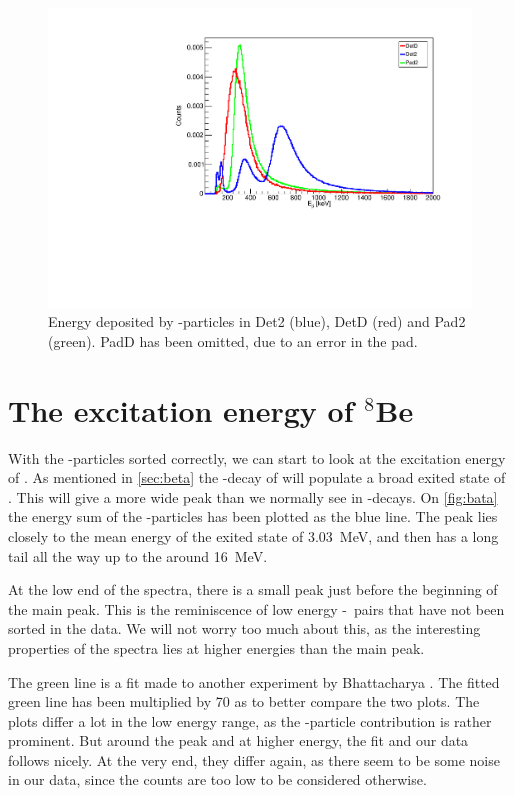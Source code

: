 \begin{figure}[h]
	\centering
	\includegraphics[width=\linewidth]{../figures/betaSpec.pdf}
	\caption{Energy deposited by \be-particles in Det2 (blue), DetD (red) and Pad2 (green). PadD has been omitted, due to an error in the pad.}
	\label{fig:beSpectrum}
\end{figure}

\section{The excitation energy of $^8$Be}
With the \al-particles sorted correctly, we can start to look at the excitation energy of \ber. As mentioned in \cref{sec:beta} the \be-decay of \li will populate a broad exited state of \ber. This will give a more wide peak than we normally see in \al-decays. On \cref{fig:bata} the energy sum of the \al-particles has been plotted as the blue line. The peak lies closely to the mean energy of the exited state of \SI{3.03}{MeV}, and then has a long tail all the way up to the around \SI{16}{MeV}.

At the low end of the spectra, there is a small peak just before the beginning of the main peak. This is the reminiscence of low energy \be-\be\ pairs that have not been sorted in the data. We will not worry too much about this, as the interesting properties of the spectra lies at higher energies than the main peak.

The green line is a fit made to another experiment by Bhattacharya \cite{bata}. The fitted green line has been multiplied by 70 as to better compare the two plots. 
The plots differ a lot in the low energy range, as the \be-particle contribution is rather prominent. But around the peak and at higher energy, the fit and our data follows nicely. At the very end, they differ again, as there seem to be some noise in our data, since the counts are too low to be considered otherwise. 

